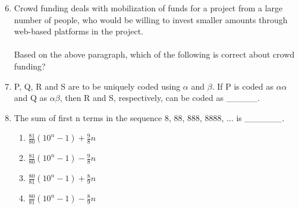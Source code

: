 \documentclass[12pt,onecolumn]{article}
\begin{document}
\begin{enumerate}
    \setcounter{enumi}{5}
    \item Crowd funding deals with mobilization of funds for a project from a large number of people, who would be willing to invest smaller amounts through web-based platforms in the project.\\\\Based on the above paragraph, which of the following is correct about crowd funding?
          \begin{enumerate}
          \end{enumerate}

    \item P, Q, R and S are to be uniquely coded using $\alpha$ and $\beta$. If P is coded as $\alpha\alpha$ and Q as $\alpha\beta$, then R and S, respectively, can be coded as \_\_\_\_\_.
          \begin{enumerate}
          \end{enumerate}

    \item The sum of first n terms in the sequence 8, 88, 888, 8888, ... is \_\_\_\_\_\_.
          \begin{enumerate}
              \item $\frac{81}{80}(10^n-1)+\frac{9}{8}n$
              \item $\frac{81}{80}(10^n-1)-\frac{9}{8}n$
              \item $\frac{80}{81}(10^n-1)+\frac{8}{9}n$
              \item $\frac{80}{81}(10^n-1)-\frac{8}{9}n$
          \end{enumerate}


\end{enumerate}
\end{document}
